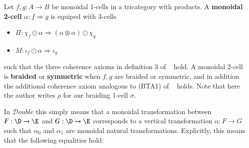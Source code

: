 \documentclass{amsart}
\begin{document}
\begin{defn}\label{Def:monverttrans}
Let $f, g:A \rightarrow B$ be monoidal 1-cells in a tricategory with products. A {\bf monoidal 2-cell} $\alpha: f \Rightarrow g$ is equiped with 3-cells
\begin{itemize}
\item $\Pi: \chi_f \odot \alpha \Rightarrow (\alpha \otimes \alpha) \odot \chi_g$
\item $M: \iota_f \odot \alpha \Rightarrow \iota_g$
\end{itemize}
such that the three coherence axioms in definition 3 of ~\cite{gg:ldstr-tricat} hold.
A monoidal 2-cell is {\bf braided} or {\bf symmetric} when $f,g$ are braided or symmetric, and in addition the additional coherence axiom analogous to (BTA1) of ~\cite[p143]{mccrudden:bal-coalgb} holds. Note that here the author writes $\rho$ for our braiding 1-cell $\sigma$.
\end{defn}

In $\mathcal{D}ouble$ this simply means that a monoidal transformation between $F:\D \rightarrow \E$ and $G: \D \rightarrow \E$ corresponds to a vertical transformation $\alpha: F \rightarrow G$ such that $\alpha_0$ and $\alpha_1$ are monoidal natural transformations.
  Explicitly, this means that the following equalities hold:
\end{document}
